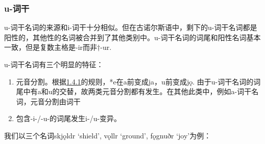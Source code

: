 \subsubsection{u-词干}\label{u-ux8bcdux5e72}

u-词干名词的来源和i-词干十分相似。但在古诺尔斯语中，剩下的u-词干名词都是阳性的，其他性的名词被合并到了其他类别中。u-词干名词的词尾和阳性名词基本一致，但是复数主格是-ir而非†-ur.

u-词干名词有三个明显的特征：

\begin{enumerate}
  \def\labelenumi{\arabic{enumi})}
  \item
        元音分割。根据\hyperref[ux5143ux97f3ux7684ux97f3ux53d8]{1.4.1}的规则，*e在a前变成ja，u前变成jǫ.
        由于u-词干名词的词尾中有a和u的交替，故两类元音分割都有发生。在其他此类中，例如a-词干名词，元音分割由词干
  \item
        包含-i-/-u-的词尾发生i-/u-变异。
\end{enumerate}

我们以三个名词skjǫldr `shield', vǫllr `ground', fǫgnuðr `joy'为例：

